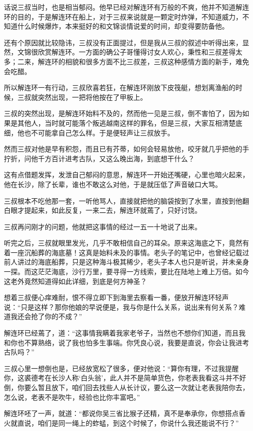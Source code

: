 话说三叔当时，也是相当郁闷。他早已经对解连环有万般的不爽，他并不知道解连环的目的，于是解连环在船上，对于三叔来说就是一颗定时炸弹，不知道威力，不知道什么时候爆炸，本来挺好的和文锦谈情说爱的时间，却变得要防备他。

还有个原因就比较隐讳，三叔没有正面提过，但是我从三叔的叙述中听得出来，显然，文锦很欣赏解连环。一方面的确公子哥懂得讨女人欢心，秉性和三叔差得太多；二来，解连环的相貌和很多方面不比三叔差，三叔这种感情方面的新手，难免会吃醋。

所以解连环一有行动，三叔欣喜若狂，在解连环刚放下皮筏艇，想划离渔船的时候，三叔就突然出现，一把将他按在了甲板上。

三叔的突然出现，是解连环始料不及的，然而他一见是三叔，倒不害怕了，因为如果是其他人，当时就可能落个叛逃越南这样的罪名，但是三叔，大家互相清楚底细，他也不可能拿自己怎么样。于是便轻声让三叔放手。

然而三叔对他是早有积怨，而且已有芥蒂，如何会轻易放他，咬牙就几乎把他的手拧折，问他千方百计进考古队，又这么晚出海，到底想干什么？

这有点借题发挥，发泄自己郁闷的意思，解连环一开始还嘴硬，心里也暗火起来，他在长沙，除了长辈，谁也不敢这么对他，于是就压低了声音破口大骂。

三叔根本不吃他那一套，一听他骂人，直接就把他的脑袋按到了水里，直按到他翻白眼才提起来，如此反复，一来二去，解连环就蔫了，只好讨饶。

三叔再问刚才的问题，他就把这事情的经过一五一十地说了出来。

听完之后，三叔就眼里发光，几乎不敢相信自己的耳朵。原来这海底之下，竟然有着一座沉船葬的海底墓！这真是始料未及的事情。老头子的笔记中，也曾经记载过前人讲过的海底船葬，只是这种海斗极其稀少，老头子本人也只是听说，并未亲身一探。而这茫茫海底，沙行万里，要寻得一方线索，要比在陆地上难上万倍。如今这老外竟然知道得如此详细，到底是何方神圣？

想着三叔便心痒难耐，恨不得立即下到海里去察看一番，便放开解连环轻声说：“只是这样？那你他娘的早说便是，我与你是什么关系，说出来有何关系？难道我还会抢了你的不成？”

解连环已经蔫了，道：“这事情我瞒着我家老爷子，当然也不想你们知道，而且我和你也不算熟络，说了我也怕多生事端。你凭良心说，我要是直说，你会让我进考古队吗？”

三叔心里一想倒也是，已经放宽松了很多，便对他说：“算你有理，不过我提醒你，这裘德考在长沙人称‘白头翁’，此人并不是简单货色，你老表我看这斗并不好倒，你要么暂且放下，咱们回去找些人从长计议，要么这一次就让老表我陪你去，怎么说，老表不是吹牛，经验也比你丰富吧。”

解连环呸了一声，就道：“都说你吴三省比猴子还精，真不是奉承你，你想搭点香火就直说，咱们是同一绳上的蚱蜢，到这个时候了，你说什么我还能说不行？”

